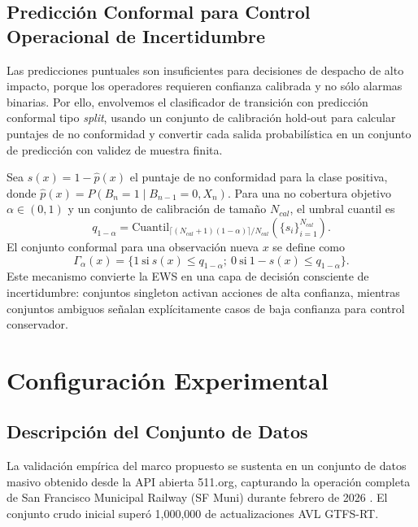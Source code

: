 \documentclass[journal,twocolumn]{IEEEtran}
\begin{document}
\subsection{Predicción Conformal para Control Operacional de Incertidumbre}
Las predicciones puntuales son insuficientes para decisiones de despacho de alto impacto, porque los operadores requieren confianza calibrada y no sólo alarmas binarias. Por ello, envolvemos el clasificador de transición con predicción conformal tipo \textit{split}, usando un conjunto de calibración hold-out para calcular puntajes de no conformidad y convertir cada salida probabilística en un conjunto de predicción con validez de muestra finita.

Sea $s(x)=1-\hat{p}(x)$ el puntaje de no conformidad para la clase positiva, donde $\hat{p}(x)=P(B_n=1\mid B_{n-1}=0, X_n)$. Para una no cobertura objetivo $\alpha\in(0,1)$ y un conjunto de calibración de tamaño $N_{cal}$, el umbral cuantil es
\begin{equation}
	q_{1-\alpha}=\text{Cuantil}_{\lceil (N_{cal}+1)(1-\alpha)\rceil /N_{cal}}\left(\{s_i\}_{i=1}^{N_{cal}}\right).
\end{equation}
El conjunto conformal para una observación nueva $x$ se define como
\begin{equation}
	\Gamma_{\alpha}(x)=\{1\ \text{si}\ s(x)\le q_{1-\alpha};\ 0\ \text{si}\ 1-s(x)\le q_{1-\alpha}\}.
\end{equation}
Este mecanismo convierte la EWS en una capa de decisión consciente de incertidumbre: conjuntos singleton activan acciones de alta confianza, mientras conjuntos ambiguos señalan explícitamente casos de baja confianza para control conservador.

\section{Configuración Experimental}

\subsection{Descripción del Conjunto de Datos}
La validación empírica del marco propuesto se sustenta en un conjunto de datos masivo obtenido desde la API abierta 511.org, capturando la operación completa de San Francisco Municipal Railway (SF Muni) durante febrero de 2026 \cite{28}. El conjunto crudo inicial superó 1,000,000 de actualizaciones AVL GTFS-RT.
\end{document}
